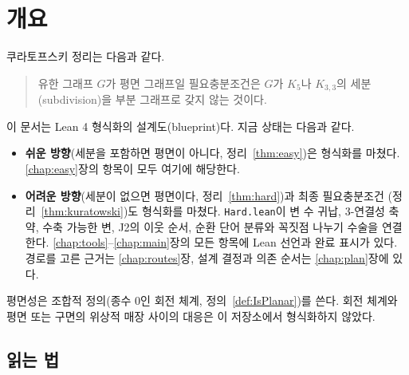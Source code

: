 \chapter{개요}
\label{chap:intro}

쿠라토프스키 정리는 다음과 같다.
\begin{quote}
유한 그래프 \(G\)가 평면 그래프일 필요충분조건은 \(G\)가 \(K_5\)나 \(K_{3,3}\)의 세분(subdivision)을 부분
그래프로 갖지 않는 것이다.
\end{quote}
이 문서는 Lean 4 형식화의 설계도(blueprint)다. 지금 상태는 다음과 같다.
\begin{itemize}
  \item \textbf{쉬운 방향}(세분을 포함하면 평면이 아니다, 정리~\ref{thm:easy})은 형식화를 마쳤다.
        \ref{chap:easy}장의 항목이 모두 여기에 해당한다.
  \item \textbf{어려운 방향}(세분이 없으면 평면이다, 정리~\ref{thm:hard})과 최종 필요충분조건
        (정리~\ref{thm:kuratowski})도 형식화를 마쳤다. \texttt{Hard.lean}이 변 수 귀납, 3-연결성 축약,
        수축 가능한 변, J2의 이웃 순서, 순환 단어 분류와 꼭짓점 나누기 수술을 연결한다.
        \ref{chap:tools}--\ref{chap:main}장의 모든 항목에 Lean 선언과 완료 표시가 있다.
        경로를 고른 근거는 \ref{chap:routes}장, 설계 결정과 의존 순서는 \ref{chap:plan}장에 있다.
\end{itemize}

평면성은 조합적 정의(종수 0인 회전 체계, 정의~\ref{def:IsPlanar})를 쓴다.
회전 체계와 평면 또는 구면의 위상적 매장 사이의 대응은 이 저장소에서 형식화하지 않았다.

\section*{읽는 법}

